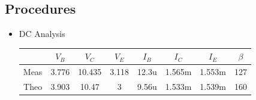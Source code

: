     \subsection{Procedures}
    \begin{itemize}
    \item DC Analysis\par
    \begin{table}[h]
    \centering
        \begin{tabular}{|c|c|c|c|c|c|c|c|}
        \hline
        & $V_B$ & $V_C$  & $V_E$ & $I_B$ & $I_C$  & $I_E$  & $\beta$ \\ \hline
        Meas & 3.776 & 10.435 & 3.118 & 12.3u & 1.565m & 1.553m & 127     \\ \hline
        Theo & 3.903 & 10.47  & 3     & 9.56u & 1.533m & 1.539m & 160     \\ \hline
    \end{tabular}
    \end{table}
    \FloatBarrier
    

\end{itemize}
